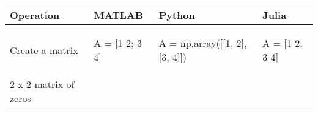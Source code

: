 \documentclass[10pt, landscape]{article}
\newenvironment{Shaded}{}{}
\newcommand{\DecValTok}[1]{\textcolor[rgb]{0.25,0.63,0.44}{{#1}}}
\newcommand{\FloatTok}[1]{\textcolor[rgb]{0.25,0.63,0.44}{{#1}}}
\newcommand{\OperatorTok}[1]{\textcolor[rgb]{0.40,0.40,0.40}{{#1}}}
\newcommand{\NormalTok}[1]{{#1}}
\begin{document}
\begin{multicols*}{2}
\begin{tabular}[ ]{@{}llll@{}}
\toprule
\begin{minipage}[b]{0.24\columnwidth}\raggedright\strut
Operation\strut
\end{minipage} & \begin{minipage}[b]{0.20\columnwidth}\raggedright\strut
MATLAB\strut
\end{minipage} & \begin{minipage}[b]{0.25\columnwidth}\raggedright\strut
Python\strut
\end{minipage} & \begin{minipage}[b]{0.20\columnwidth}\raggedright\strut
Julia\strut
\end{minipage}\tabularnewline
\midrule
\begin{minipage}[t]{0.24\columnwidth}\raggedright\strut
Create a matrix\strut
\end{minipage} & \begin{minipage}[t]{0.20\columnwidth}\raggedright\strut
\begin{Shaded}
\begin{Highlighting}[]
\NormalTok{A = [}\FloatTok{1} \FloatTok{2}\NormalTok{; }\FloatTok{3} \FloatTok{4}\NormalTok{]}
\end{Highlighting}
\end{Shaded}
\strut
\end{minipage} & \begin{minipage}[t]{0.25\columnwidth}\raggedright\strut
\begin{Shaded}
\begin{Highlighting}[]
\NormalTok{A }\OperatorTok{=} \NormalTok{np.array([[}\DecValTok{1}\NormalTok{, }\DecValTok{2}\NormalTok{], [}\DecValTok{3}\NormalTok{, }\DecValTok{4}\NormalTok{]])}
\end{Highlighting}
\end{Shaded}
\strut
\end{minipage} & \begin{minipage}[t]{0.20\columnwidth}\raggedright\strut
\begin{Shaded}
\begin{Highlighting}[]
\NormalTok{A = [}\FloatTok{1} \FloatTok{2}\NormalTok{; }\FloatTok{3} \FloatTok{4}\NormalTok{]}
\end{Highlighting}
\end{Shaded}
\strut
\end{minipage}\tabularnewline
\begin{minipage}[t]{0.24\columnwidth}\raggedright\strut
2 x 2 matrix of zeros\strut

\end{minipage}
\end{tabular}
\end{multicols*}
\end{document}
